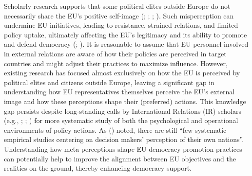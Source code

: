 \documentclass[
  letterpaper,
  DIV=11,
  numbers=noendperiod]{scrartcl}
\begin{document}
Scholarly research supports that some political elites outside Europe do
not necessarily share the EU's positive self-image
(;
;
;
). Such
misperception can undermine EU initiatives, leading to resistance,
strained relations, and limited policy uptake, ultimately affecting the
EU's legitimacy and its ability to promote and defend democracy
(;
). It is reasonable to
assume that EU personnel involved in external relations are aware of how
their policies are perceived in target countries and might adjust their
practices to maximize influence. However, existing research has focused
almost exclusively on how the EU is perceived by political elites and
citizens outside Europe, leaving a significant gap in understanding how
EU representatives themselves perceive the EU's external image and how
these perceptions shape their (preferred) actions. This knowledge gap
persists despite long-standing calls by International Relations (IR)
scholars (e.g., ;
;
) for more
systematic study of both the psychological and operational environments
of policy actions. As () noted, there are still ``few systematic empirical studies
centering on decision makers' perception of their own nations''.
Understanding how meta-perceptions shape EU democracy promotion
practices can potentially help to improve the alignment between EU
objectives and the realities on the ground, thereby enhancing democracy
support.
\end{document}
